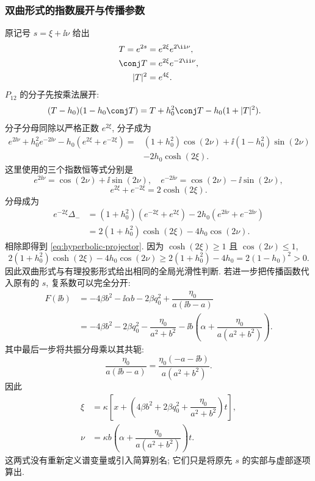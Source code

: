 \subsubsection*{双曲形式的指数展开与传播参数}
原记号 $s=\xi+\ii\nu$ 给出
\[
\begin{aligned}
T=e^{2s}&=e^{2\xi}e^{2\ii\nu},\\
\conj T&=e^{2\xi}e^{-2\ii\nu},\\
|T|^2&=e^{4\xi}.
\end{aligned}
\]
$P_{12}$ 的分子先按乘法展开:
\[
\begin{aligned}
(T-h_0)(1-h_0\conj T)
&=T+h_0^2\conj T-h_0(1+|T|^2).
\end{aligned}
\]
分子分母同除以严格正数 $e^{2\xi}$, 分子成为
\[
\begin{aligned}
e^{2\ii\nu}+h_0^2e^{-2\ii\nu}
-h_0(e^{2\xi}+e^{-2\xi})
={}&(1+h_0^2)\cos(2\nu)
+\ii(1-h_0^2)\sin(2\nu)\\
&-2h_0\cosh(2\xi).
\end{aligned}
\]
这里使用的三个指数恒等式分别是
\[
e^{2\ii\nu}=\cos(2\nu)+\ii\sin(2\nu),\quad
e^{-2\ii\nu}=\cos(2\nu)-\ii\sin(2\nu),
\]
\[
e^{2\xi}+e^{-2\xi}=2\cosh(2\xi).
\]
分母成为
\[
\begin{aligned}
e^{-2\xi}\Delta_-
&=(1+h_0^2)(e^{-2\xi}+e^{2\xi})
-2h_0(e^{2\ii\nu}+e^{-2\ii\nu})\\
&=2(1+h_0^2)\cosh(2\xi)-4h_0\cos(2\nu).
\end{aligned}
\]
相除即得到 \eqref{eq:hyperbolic-projector}.
因为 $\cosh(2\xi)\ge1$ 且 $\cos(2\nu)\le1$,
\[
2(1+h_0^2)\cosh(2\xi)-4h_0\cos(2\nu)
\ge2(1+h_0^2)-4h_0=2(1-h_0)^2>0.
\]
因此双曲形式与有理投影形式给出相同的全局光滑性判断.
若进一步把传播函数代入原有的 $s$, 复系数可以完全分开:
\[
\begin{aligned}
F(\ii b)
&=-4\beta b^2-\ii\alpha b-2\beta q_0^2
+\dfrac{\eta_0}{a(\ii b-a)}\\
&=-4\beta b^2-2\beta q_0^2-\dfrac{\eta_0}{a^2+b^2}
-\ii b\left(\alpha+\dfrac{\eta_0}{a(a^2+b^2)}\right).
\end{aligned}
\]
其中最后一步将共振分母乘以其共轭:
\[
\dfrac{\eta_0}{a(\ii b-a)}
=\dfrac{\eta_0(-a-\ii b)}{a(a^2+b^2)}.
\]
因此
\[
\begin{aligned}
\xi
&=\kappa\left[
x+\left(4\beta b^2+2\beta q_0^2
+\dfrac{\eta_0}{a^2+b^2}\right)t
\right],\\
\nu
&=\kappa b\left(\alpha+\dfrac{\eta_0}{a(a^2+b^2)}\right)t.
\end{aligned}
\]
这两式没有重新定义谱变量或引入简算别名;
它们只是将原先 $s$ 的实部与虚部逐项算出.
